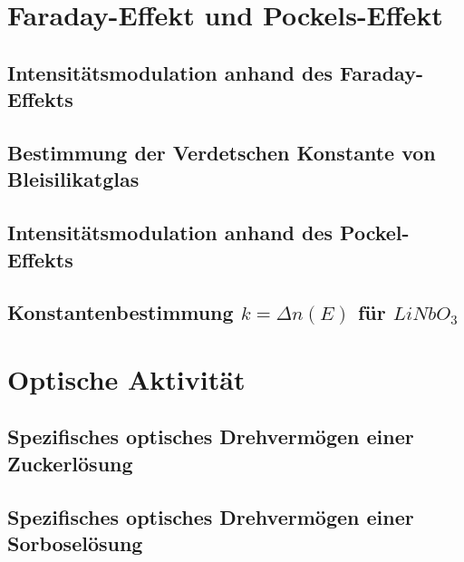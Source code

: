 \documentclass[a4paper,titlepage]{scrartcl}
\numberwithin{equation}{section}
\begin{document}
\section{Faraday-Effekt und Pockels-Effekt}
\subsection{Intensitätsmodulation anhand des Faraday-Effekts}
\subsection{Bestimmung der Verdetschen Konstante von Bleisilikatglas}
\subsection{Intensitätsmodulation anhand des Pockel-Effekts}
\subsection{Konstantenbestimmung $k=\Delta n(E)$ für $LiNbO_3$}
\newpage
\section{Optische Aktivität}
\subsection{Spezifisches optisches Drehvermögen einer Zuckerlösung}
\subsection{Spezifisches optisches Drehvermögen einer Sorboselösung}

\newpage


\end{document}

